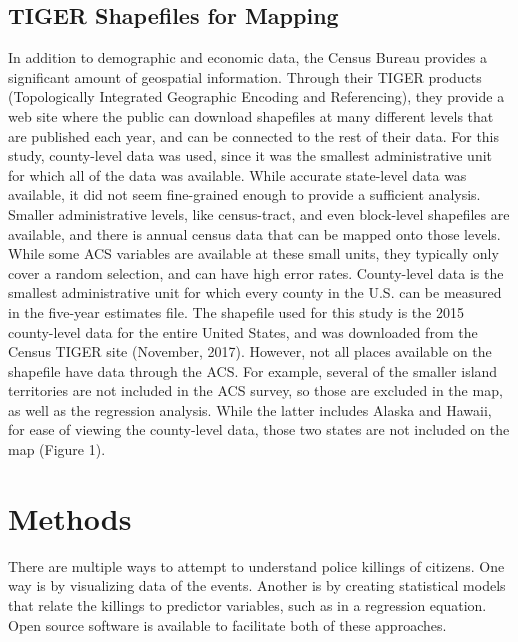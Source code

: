 \documentclass[sigconf]{acmart}
\begin{document}
\subsection{TIGER Shapefiles for Mapping}
In addition to demographic and economic data, the Census Bureau provides a significant amount of geospatial information.  Through their TIGER products (Topologically Integrated Geographic Encoding and Referencing), they provide a web site where the public can download shapefiles at many different levels that are published each year, and can be connected to the rest of their data. \cite{tiger} For this study, county-level data was used, since it was the smallest administrative unit for which all of the data was available.  While accurate state-level data was available, it did not seem fine-grained enough to provide a sufficient analysis.  Smaller administrative levels, like census-tract, and even block-level shapefiles are available, and there is annual census data that can be mapped onto those levels.  While some ACS variables are available at these small units, they typically only cover a random selection, and can have high error rates.  County-level data is the smallest administrative unit for which every county in the U.S. can be measured in the five-year estimates file.  The shapefile used for this study is the 2015 county-level data for the entire United States, and was downloaded from the Census TIGER site (November, 2017). \cite{tiger}  However, not all places available on the shapefile have data through the ACS.  For example, several of the smaller island territories are not included in the ACS survey, so those are excluded in the map, as well as the regression analysis.  While the latter includes Alaska and Hawaii, for ease of viewing the county-level data, those two states are not included on the map (Figure 1).

\section{Methods}

There are multiple ways to attempt to understand police killings of citizens.  One way is by visualizing data of the events.  Another is by creating statistical models that relate the killings to predictor variables, such as in a regression equation.  Open source software is available to facilitate both of these approaches.
\end{document}
